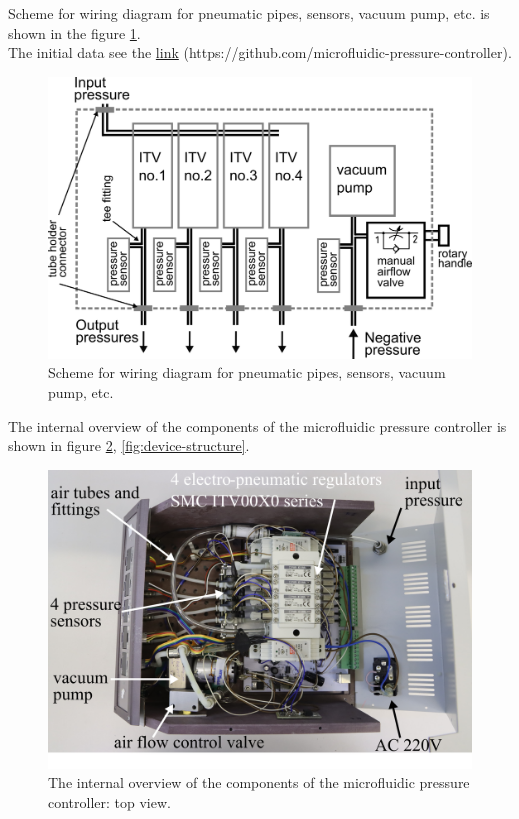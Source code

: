 \documentclass[twoside, 12pt, a4paper]{refart}
\begin{document}
    \newpage
    Scheme for wiring diagram for pneumatic pipes, sensors, vacuum pump, etc. is shown in the figure \ref{fig:pneumatic-diagram}.\\
    The initial data see the \href{https://github.com/microfluidic-pressure-controller}{link} (https://github.com/microfluidic-pressure-controller).\\
    \begin{figure}[H]
	  \begin{center}
	  \includegraphics[width=\textwidth]{imgs/pneumatic-diagram.png}
	  \caption{Scheme for wiring diagram for pneumatic pipes, sensors, vacuum pump, etc.}
	  \label{fig:pneumatic-diagram}
	  \end{center}
    \end{figure}   
    
    The internal overview of the components of the microfluidic pressure controller is shown in figure \ref{fig:device-structure2}, \ref{fig:device-structure}.
    
    \begin{figure}[H]
	  \begin{center}
	  \includegraphics[width=\textwidth]{imgs/device-structure2.png}
	  \caption{The internal overview of the components of the microfluidic pressure controller: top view.}
	  \label{fig:device-structure2}
	  \end{center}
    \end{figure}   
    
\end{document}

